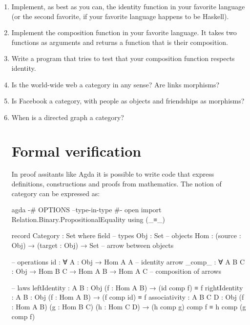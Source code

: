 \begin{enumerate}
  \tightlist
  \item
        Implement, as best as you can, the identity function in your favorite
        language (or the second favorite, if your favorite language happens to
        be Haskell).
  \item
        Implement the composition function in your favorite language. It takes
        two functions as arguments and returns a function that is their
        composition.
  \item
        Write a program that tries to test that your composition function
        respects identity.
  \item
        Is the world-wide web a category in any sense? Are links morphisms?
  \item
        Is Facebook a category, with people as objects and friendships as
        morphisms?
  \item
        When is a directed graph a category?

\section{Formal verification}

In proof assitants like Agda it is possible to write code that express
definitions, constructions and proofs from mathematics. The notion of category
can be expressed as:

\begin{snip}{agda}
{-# OPTIONS --type-in-type #-}
open import Relation.Binary.PropositionalEquality using (_≡_)

record Category : Set where
  field
    -- types
    Obj : Set                                    -- objects
    Hom : (source : Obj) → (target : Obj) → Set  -- arrow between objects

    -- operations
    id : ∀ {A : Obj} → Hom A A            -- identity arrow
    _comp_ : ∀ {A B C : Obj}
           → Hom B C → Hom A B → Hom A C  -- composition of arrows

    -- laws
    leftIdentity  : {A B : Obj} (f : Hom A B) → (id comp f) ≡ f
    rightIdentity : {A B : Obj} (f : Hom A B) → (f comp id) ≡ f
    associativity : {A B C D : Obj}
                    (f : Hom A B) (g : Hom B C) (h : Hom C D)
                  → (h comp g) comp f ≡ h comp (g comp f)
\end{snip}

\end{enumerate}
